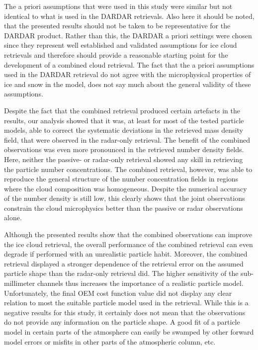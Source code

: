 \documentclass[journal abbreviation, manuscript]{copernicus}
\begin{document}
The a priori assumptions that were used in this study were similar but not
identical to what is used in the DARDAR retrievals. Also here it should be
noted, that the presented results should not be taken to be representative for
the DARDAR product. Rather than this, the DARDAR a priori settings were chosen
since they represent well established and validated assumptions for ice cloud
retrievals and therefore should provide a reasonable starting point for the
development of a combined cloud retrieval. The fact that the a priori
assumptions used in the DARDAR retrieval do not agree with the microphysical
properties of ice and snow in the model, does not say much about the general
validity of these assumptions.

Despite the fact that the combined retrieval produced certain artefacts in the
results, our analysis showed that it was, at least for most of the tested
particle models, able to correct the systematic deviations in the retrieved mass
density field, that were observed in the radar-only retrieval. The benefit of
the combined observations was even more pronounced in the retrieved number
density fields. Here, neither the passive- or radar-only retrieval showed any
skill in retrieving the particle number concentrations. The combined retrieval,
however, was able to reproduce the general structure of the number concentration
fields in regions where the cloud composition was homogeneous. Despite the
numerical accuracy of the number density is still low, this clearly shows that the
joint observations constrain the cloud microphysics better than the passive or
radar observations alone.

Although the presented results show that the combined observations can improve
the ice cloud retrieval, the overall performance of the combined retrieval can
even degrade if performed with an unrealistic particle habit. Moreover, the
combined retrieval displayed a stronger dependence of the retrieval error on the
assumed particle shape than the radar-only retrieval did. The higher sensitivity
of the sub-millimeter channels thus increases the importance of a realistic
particle model. Unfortunately, the final OEM cost function value did not display
any clear relation to most the suitable particle model used in the retrieval.
While this is a negative results for this study, it certainly does not mean that
the observations do not provide any information on the particle shape. A good
fit of a particle model in certain parts of the atmosphere can easily be
swamped by other forward model errors or misfits in other parts of the atmospheric
column, etc.
\end{document}
